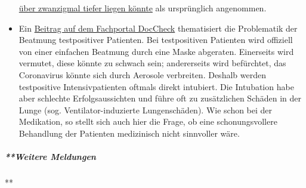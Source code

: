 \begin{itemize}
  \href{https://www.nytimes.com/2020/03/27/nyregion/new-rochelle-coronavirus.html}{über
  zwanzigmal tiefer liegen könnte} als ursprünglich angenommen.
\item
  Ein
  \href{https://www.doccheck.com/de/detail/articles/26271-covid-19-beatmung-und-dann}{Beitrag
  auf dem Fachportal DocCheck} thematisiert die Problematik der Beatmung
  testpositiver Patienten. Bei testpositiven Patienten wird offiziell
  von einer einfachen Beatmung durch eine Maske abgeraten. Einerseits
  wird vermutet, diese könnte zu schwach sein; andererseits wird
  befürchtet, das Coronavirus könnte sich durch Aerosole verbreiten.
  Deshalb werden testpositive Intensivpatienten oftmals direkt
  intubiert. Die Intubation habe aber schlechte Erfolgsaussichten und
  führe oft zu zusätzlichen Schäden in der Lunge (sog.
  Ventilator-induzierte Lungenschäden). Wie schon bei der Medikation, so
  stellt sich auch hier die Frage, ob eine schonungsvollere Behandlung
  der Patienten medizinisch nicht sinnvoller wäre.
\end{itemize}

\hypertarget{weitere-meldungen-3}{%
\subparagraph{**Weitere Meldungen}\label{weitere-meldungen-3}}

**

